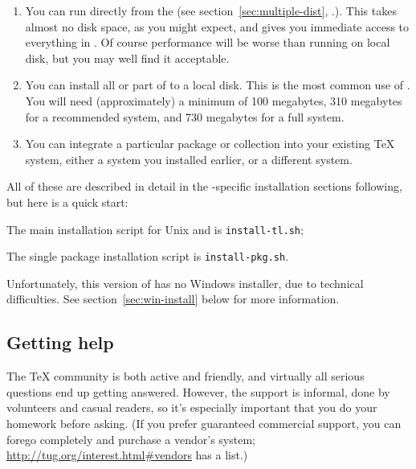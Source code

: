 \documentclass{article}
\begin{document}
\begin{enumerate}

\item You can run \TL{} directly from the \DVD
(see section~\ref{sec:multiple-dist}, \p.\pageref{sec:multiple-dist}).
This takes almost no disk space, as you might expect, and gives you
immediate access to everything in \TL{}.  Of course performance
will be worse than running on local disk, but you may well find it
acceptable.

\item You can install all or part of \TL{} to a local disk.  This
is the most common use of \TL.  You will need (approximately) a
minimum of 100 megabytes, 310 megabytes for a recommended system, and
730 megabytes for a full system.

\item You can integrate a particular package or collection into your
existing \TeX{} system, either a \TL{} system you installed
earlier, or a different system.

\end{enumerate}

\noindent All of these are described in detail in the -specific
installation sections following, but here is a quick start:

\begin{itemize*}

\item The main installation script for Unix and \MacOSX{} is
\texttt{install-tl.sh};

\item The single package installation script is \texttt{install-pkg.sh}.

\item Unfortunately, this version of \TL{} has no Windows installer, due
to technical difficulties.  See section~\ref{sec:win-install} below
for more information.

\end{itemize*}


\subsection{Getting help}
\label{sec:help}

The \TeX{} community is both active and friendly, and virtually all
serious questions end up getting answered.  However, the support is
informal, done by volunteers and casual readers, so it's especially
important that you do your homework before asking.  (If you prefer
guaranteed commercial support, you can forego \TL{} completely and
purchase a vendor's system; \url{http://tug.org/interest.html#vendors}
has a list.)
\end{document}
